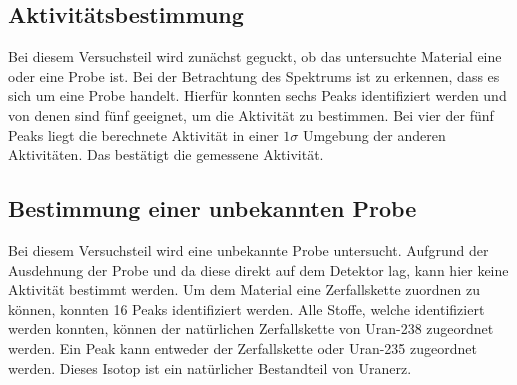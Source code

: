 \subsection{Aktivitätsbestimmung}
Bei diesem Versuchsteil wird zunächst geguckt, ob das untersuchte Material eine  oder eine  Probe ist.
Bei der Betrachtung des Spektrums ist zu erkennen, dass es sich um eine  Probe handelt.
Hierfür konnten sechs Peaks identifiziert werden und von denen sind fünf geeignet, um die Aktivität zu bestimmen.
Bei vier der fünf Peaks liegt die berechnete Aktivität in einer $1\sigma$ Umgebung der anderen Aktivitäten. 
Das bestätigt die gemessene Aktivität.
\subsection{Bestimmung einer unbekannten Probe}
Bei diesem Versuchsteil wird eine unbekannte Probe untersucht. Aufgrund der Ausdehnung der Probe und da diese direkt auf dem Detektor
lag, kann hier keine Aktivität bestimmt werden.
Um dem Material eine Zerfallskette zuordnen zu können, konnten 16 Peaks identifiziert werden. Alle Stoffe, welche identifiziert 
werden konnten, können der natürlichen Zerfallskette von Uran-238 zugeordnet werden. Ein Peak kann entweder der Zerfallskette 
oder Uran-235 zugeordnet werden. Dieses Isotop ist ein natürlicher Bestandteil von Uranerz. 